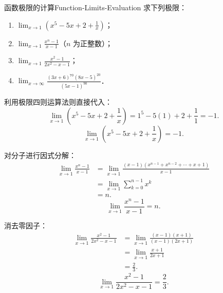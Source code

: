 \begin{problem}{函数极限的计算}{Function-Limits-Evaluation}
    求下列极限：
    \begin{enumerate}
        \item $\lim_{x\to 1} \left( x^5 - 5x + 2 + \frac{1}{x} \right)$；
        \item $\lim_{x\to 1} \frac{x^n - 1}{x - 1}$（$n$ 为正整数）；
        \item $\lim_{x\to 1} \frac{x^2 - 1}{2x^2 - x - 1}$；
        \item $\lim_{x\to\infty} \frac{(3x+6)^{70}(8x-5)^{20}}{(5x-1)^{90}}$．
    \end{enumerate}
\end{problem}

\begin{solution}

    利用极限四则运算法则直接代入：
    \begin{equation}
        \lim_{x\to 1} \left( x^5 - 5x + 2 + \frac{1}{x} \right) = 1^5 - 5(1) + 2 + \frac{1}{1} = -1.
    \end{equation}
    \begin{equation}
        \boxed{\lim_{x\to 1} \left( x^5 - 5x + 2 + \frac{1}{x} \right) = -1.}
    \end{equation}


    对分子进行因式分解：
    \begin{equation}
        \begin{aligned}
            \lim_{x\to 1} \frac{x^n - 1}{x - 1} & = \lim_{x\to 1} \frac{(x-1)(x^{n-1} + x^{n-2} + \cdots + x + 1)}{x - 1} \\
                                                & = \lim_{x\to 1} \sum_{k=0}^{n-1} x^k                                    \\
                                                & = n.
        \end{aligned}
    \end{equation}
    \begin{equation}
        \boxed{\lim_{x\to 1} \frac{x^n - 1}{x - 1} = n.}
    \end{equation}


    消去零因子：
    \begin{equation}
        \begin{aligned}
            \lim_{x\to 1} \frac{x^2 - 1}{2x^2 - x - 1} & = \lim_{x\to 1} \frac{(x-1)(x+1)}{(x-1)(2x+1)} \\
                                                       & = \lim_{x\to 1} \frac{x+1}{2x+1}               \\
                                                       & = \frac{2}{3}.
        \end{aligned}
    \end{equation}
    \begin{equation}
        \boxed{\lim_{x\to 1} \frac{x^2 - 1}{2x^2 - x - 1} = \frac{2}{3}.}
    \end{equation}


\end{solution}
